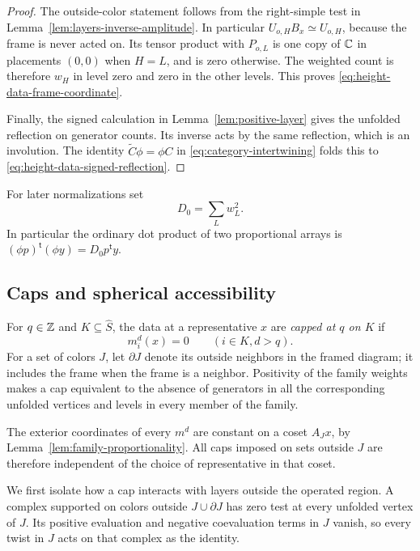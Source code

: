 \begin{proof}
The outside-color statement follows from the right-simple
test in Lemma~\ref{lem:layers-inverse-amplitude}.  In
particular $U_{o,H}B_x\simeq U_{o,H}$, because the frame is
never acted on.  Its tensor product with $P_{o,L}$ is one
copy of $\mathbb C$ in placements $(0,0)$ when $H=L$, and is zero
otherwise.  The weighted count is therefore $w_H$ in level
zero and zero in the other levels.  This proves
\eqref{eq:height-data-frame-coordinate}.

Finally, the signed calculation in
Lemma~\ref{lem:positive-layer} gives the unfolded reflection
on generator counts.  Its inverse acts by the same reflection,
which is an involution.  The identity $\widetilde C\phi=\phi C$ in
\eqref{eq:category-intertwining} folds this to
\eqref{eq:height-data-signed-reflection}.
\end{proof}

For later normalizations set
\begin{equation}
 D_0=\sum_Lw_L^2.
 \label{eq:height-data-D0}
\end{equation}
In particular the ordinary dot product of two proportional
arrays is $(\phi p)^{\mathsf t}(\phi y)=D_0p^{\mathsf t}y$.

\subsection{Caps and spherical accessibility}

\begin{definition}[Cap]
\label{def:height-data-cap}
For $q\in\mathbb Z$ and $K\subseteq\widehat S$, the data at a
representative $x$ are \emph{capped at $q$ on $K$} if
\[
 m_i^d(x)=0\qquad(i\in K, d>q).
\]
For a set of colors $J$, let $\partial J$ denote its outside
neighbors in the framed diagram; it includes the frame when
the frame is a neighbor.  Positivity of the family weights
makes a cap equivalent to the absence of generators in all
the corresponding unfolded vertices and levels in every
member of the family.
\end{definition}

The exterior coordinates of every $m^d$ are constant on a
coset $A_Jx$, by Lemma~\ref{lem:family-proportionality}.
All caps imposed on sets outside $J$ are therefore independent
of the choice of representative in that coset.

We first isolate how a cap interacts with layers outside the
operated region.  A complex supported on colors outside
$J\cup\partial J$ has zero test at every unfolded vertex
of $J$.  Its positive evaluation and negative coevaluation
terms in $J$ vanish, so every twist in $J$ acts on that
complex as the identity.

